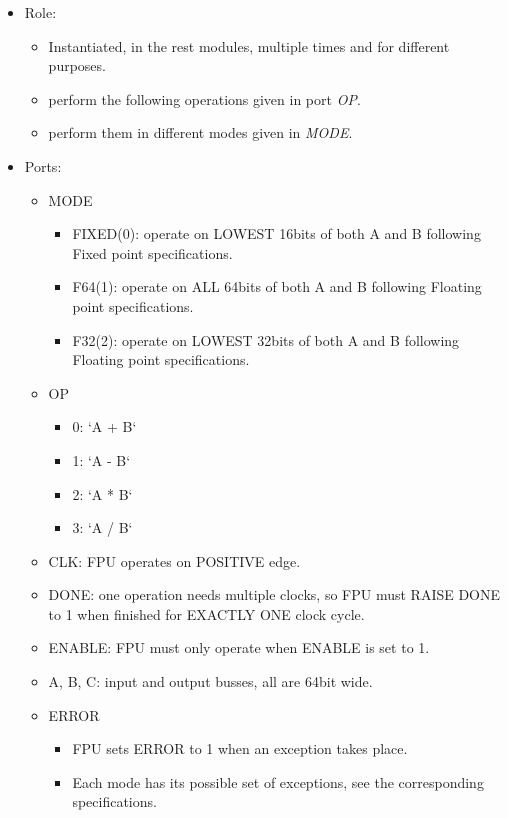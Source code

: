 \documentclass[12pt]{extarticle}
\begin{document}
\begin{itemize}
    \item Role:
    \begin{itemize}
        \item Instantiated, in the rest modules, multiple times and for different purposes.
        \item perform the following operations given in port \emph{OP}.
        \item perform them in different modes given in \emph{MODE}.
    \end{itemize}
    \item Ports:
    \begin{itemize}
        \item MODE
        \begin{itemize}
            \item FIXED(0): operate on LOWEST 16bits of both A and B following Fixed point specifications.
            \item F64(1): operate on ALL 64bits of both A and B following Floating point specifications.
            \item F32(2): operate on LOWEST 32bits of both A and B following Floating point specifications.
        \end{itemize}
        \item OP
        \begin{itemize}
            \item 0: `A + B` 
            \item 1: `A - B` 
            \item 2: `A * B` 
            \item 3: `A / B`  
        \end{itemize}
        \item CLK: FPU operates on POSITIVE edge.
        \item DONE: one operation needs multiple clocks, so FPU must RAISE DONE to 1 when finished for EXACTLY ONE clock cycle.
        \item ENABLE: FPU must only operate when ENABLE is set to 1.
        \item A, B, C: input and output busses, all are 64bit wide.
        \item ERROR
        \begin{itemize}
            \item FPU sets ERROR to 1 when an exception takes place. 
            \item Each mode has its possible set of exceptions, see the corresponding specifications. 

\end{itemize}
\end{itemize}
\end{itemize}
\end{document}
